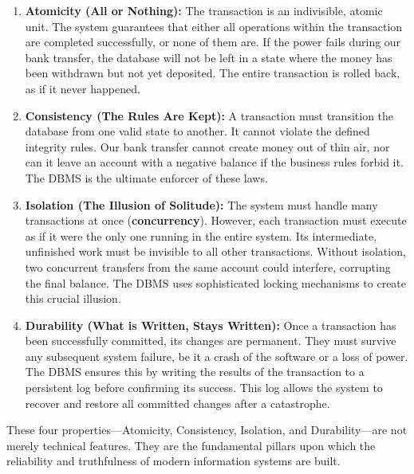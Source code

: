 \documentclass[12pt,a4paper]{article}
\begin{document}
\begin{enumerate}
    \item \textbf{Atomicity (All or Nothing):} The transaction is an indivisible, atomic unit. The system guarantees that either all operations within the transaction are completed successfully, or none of them are. If the power fails during our bank transfer, the database will not be left in a state where the money has been withdrawn but not yet deposited. The entire transaction is rolled back, as if it never happened.

    \item \textbf{Consistency (The Rules Are Kept):} A transaction must transition the database from one valid state to another. It cannot violate the defined integrity rules. Our bank transfer cannot create money out of thin air, nor can it leave an account with a negative balance if the business rules forbid it. The DBMS is the ultimate enforcer of these laws.
    
    \item \textbf{Isolation (The Illusion of Solitude):} The system must handle many transactions at once (\textbf{concurrency}). However, each transaction must execute as if it were the only one running in the entire system. Its intermediate, unfinished work must be invisible to all other transactions. Without isolation, two concurrent transfers from the same account could interfere, corrupting the final balance. The DBMS uses sophisticated locking mechanisms to create this crucial illusion.

    \item \textbf{Durability (What is Written, Stays Written):} Once a transaction has been successfully committed, its changes are permanent. They must survive any subsequent system failure, be it a crash of the software or a loss of power. The DBMS ensures this by writing the results of the transaction to a persistent log before confirming its success. This log allows the system to recover and restore all committed changes after a catastrophe.
\end{enumerate}

These four properties---Atomicity, Consistency, Isolation, and Durability---are not merely technical features. They are the fundamental pillars upon which the reliability and truthfulness of modern information systems are built.
\end{document}
